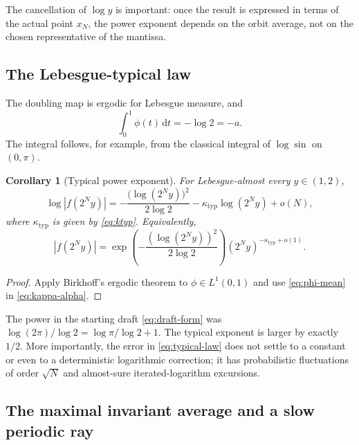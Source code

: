 \documentclass[11pt,oneside]{article}
\newtheorem{corollary}[theorem]{Corollary}
\theoremstyle{definition}
\theoremstyle{remark}
\newcommand{\dd}{\,\mathrm d}
\newcommand{\smallo}{o}
\begin{document}
The cancellation of $\log y$ is important: once the result is expressed in
terms of the actual point $x_N$, the power exponent depends on the orbit
average, not on the chosen representative of the mantissa.

\subsection{The Lebesgue-typical law}

The doubling map is ergodic for Lebesgue measure, and
\begin{equation}
 \int_0^1\phi(t)\dd t=-\log2=-a.                            \label{eq:phi-mean}
\end{equation}
The integral follows, for example, from the classical integral of
$\log\sin$ on $(0,\pi)$.

\begin{corollary}[Typical power exponent]
For Lebesgue-almost every $y\in(1,2)$,
\begin{equation}
 \boxed{\quad
 \log|f(2^Ny)|
 =-\frac{\bigl(\log(2^Ny)\bigr)^2}{2\log2}
 -\kappa_{\mathrm{typ}}\log(2^Ny)+\smallo(N),
 \quad}                                                     \label{eq:typical-law}
\end{equation}
where $\kappa_{\mathrm{typ}}$ is given by \eqref{eq:ktyp}.  Equivalently,
\begin{equation}
 |f(2^Ny)|
 =\exp\!\left(-\frac{(\log(2^Ny))^2}{2\log2}\right)
 (2^Ny)^{-\kappa_{\mathrm{typ}}+\smallo(1)}.               \label{eq:typical-multiplicative}
\end{equation}
\end{corollary}

\begin{proof}
Apply Birkhoff's ergodic theorem to $\phi\in L^1(0,1)$ and use
\eqref{eq:phi-mean} in \cref{eq:kappa-alpha}.
\end{proof}

The power in the starting draft \eqref{eq:draft-form} was
$\log(2\pi)/\log2=\log\pi/\log2+1$.  The typical exponent is larger by exactly
$1/2$.  More importantly, the error in \eqref{eq:typical-law} does not settle
to a constant or even to a deterministic logarithmic correction; it has
probabilistic fluctuations of order $\sqrt N$ and almost-sure iterated-logarithm
excursions.

\subsection{The maximal invariant average and a slow periodic ray}
\end{document}
